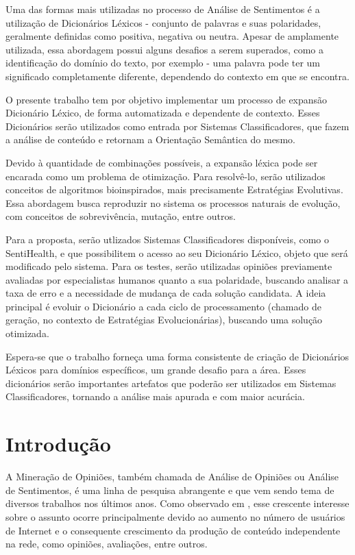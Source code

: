 \documentclass[a4paper,11pt]{article}
\begin{document}
Uma das formas mais utilizadas no processo de Análise de Sentimentos é a utilização de Dicionários Léxicos  - conjunto de palavras e suas polaridades, geralmente definidas como positiva, negativa ou neutra. Apesar de amplamente utilizada, essa abordagem possui alguns desafios a serem superados, como a identificação do domínio do texto, por exemplo - uma palavra pode ter um significado completamente diferente, dependendo do contexto em que se encontra.

O presente trabalho tem por objetivo implementar um processo de expansão Dicionário Léxico, de forma automatizada e dependente de contexto. Esses Dicionários serão utilizados como entrada por Sistemas Classificadores, que fazem a análise de conteúdo e retornam a Orientação Semântica do mesmo. 

Devido à quantidade de combinações possíveis, a expansão léxica pode ser encarada como um problema de otimização. Para resolvê-lo, serão utilizados conceitos de algoritmos bioinspirados, mais precisamente Estratégias Evolutivas. Essa abordagem busca reproduzir no sistema os processos naturais de evolução, com conceitos de sobrevivência, mutação, entre outros. 

Para a proposta, serão utlizados Sistemas Classificadores disponíveis, como o SentiHealth, e que possibilitem o acesso ao seu Dicionário Léxico, objeto que será modificado pelo sistema. Para os testes, serão utilizadas opiniões previamente avaliadas por especialistas humanos quanto a sua polaridade, buscando analisar a taxa de erro e a necessidade de mudança de cada solução candidata. A ideia principal é evoluir o Dicionário a cada ciclo de processamento (chamado de geração, no contexto de Estratégias Evolucionárias), buscando uma solução otimizada.

Espera-se que o trabalho forneça uma forma consistente de criação de Dicionários Léxicos para domínios específicos, um grande desafio para a área. Esses dicionários serão importantes artefatos que poderão ser utilizados em Sistemas Classificadores, tornando a análise mais apurada e com maior acurácia.

\section{Introdução}

A Mineração de Opiniões, também chamada de Análise de Opiniões ou Análise de Sentimentos, é uma linha de pesquisa abrangente e que vem sendo tema de diversos trabalhos nos últimos anos. Como observado em \cite{liu2010multifaceted}, esse crescente interesse sobre o assunto ocorre principalmente devido ao aumento no número de usuários de Internet e o consequente crescimento da produção de conteúdo independente na rede, como opiniões, avaliações, entre outros. 
\end{document}
